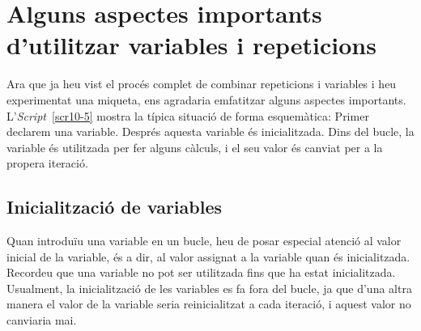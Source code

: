 \section{Alguns aspectes importants d'utilitzar variables i repeticions}
Ara que ja heu vist el procés complet de combinar repeticions i variables i heu experimentat una miqueta, ens agradaria emfatitzar alguns aspectes importants. L'\emph{Script}~\ref{scr10-5} mostra la típica situació de forma esquemàtica: Primer declarem una variable. Després aquesta variable és inicialitzada. Dins del bucle, la variable és utilitzada per fer alguns càlculs, i el seu valor és canviat per a la propera iteració.

\subsection{Inicialització de variables}
Quan introduïu una variable en un bucle, heu de posar especial atenció al valor inicial de la variable, és a dir, al valor assignat a la variable quan és inicialitzada. Recordeu que una variable no pot ser utilitzada fins que ha estat inicialitzada. Usualment, la inicialització de les variables es fa fora del bucle, ja que d'una altra manera el valor de la variable seria reinicialitzat a cada iteració, i aquest valor no canviaria mai.

